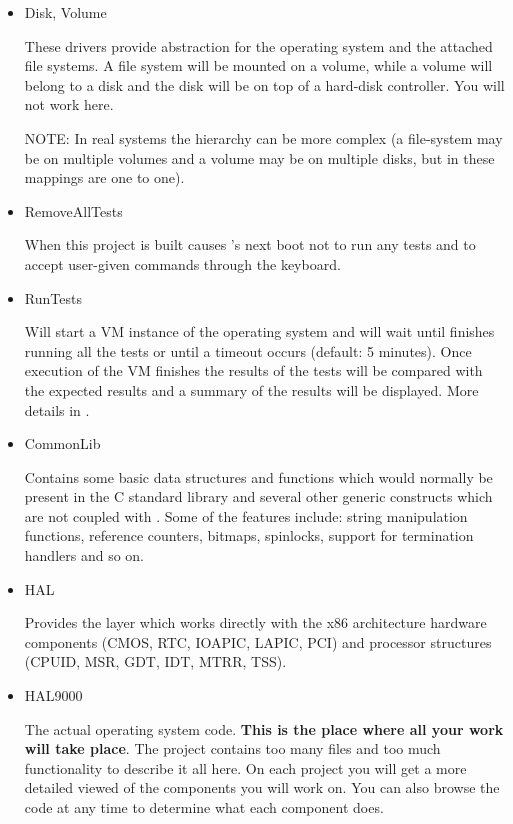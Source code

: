 \begin{itemize}
	\item Disk, Volume

	These drivers provide abstraction for the operating system and the attached file systems. A file
system will be mounted on a volume, while a volume will belong to a disk and the disk will be
on top of a hard-disk controller. You will not work here.

	NOTE: In real systems the hierarchy can be more complex (a file-system may be on multiple
volumes and a volume may be on multiple disks, but in \projectname these mappings are one to one).

	\item RemoveAllTests

	When this project is built causes \projectname's next boot not to run any tests and to accept
user-given commands through the keyboard.

	\item RunTests

	Will start a VM instance of the operating system and will wait until \projectname finishes
running all the tests or until a timeout occurs (default: 5 minutes). Once execution of the VM
finishes the results of the tests will be compared with the expected results and a summary of the
results will be displayed. More details in .

	\item CommonLib

	Contains some basic data structures and functions which would normally be present in the C
standard library and several other generic constructs which are not coupled with \projectname. Some
of the features include: string manipulation functions, reference counters, bitmaps, spinlocks,
support for termination handlers and so on.

	\item HAL

	Provides the layer which works directly with the x86 architecture hardware components (CMOS,
RTC, IOAPIC, LAPIC, PCI) and processor structures (CPUID, MSR, GDT, IDT, MTRR, TSS).

	\item HAL9000

	The actual operating system code. \textbf{This is the place where all your work will take place}.
The project contains too many files and too much functionality to describe it all here. On each
project you will get a more detailed viewed of the components you will work on. You can also browse
the code at any time to determine what each component does.

\end{itemize}

